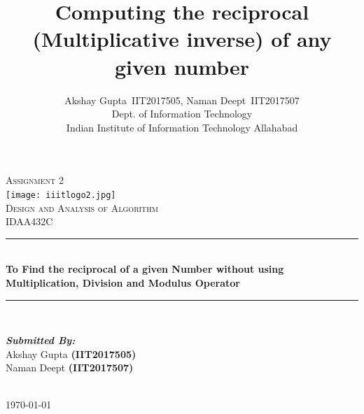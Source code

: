 \documentclass[twocolumn]{article}      %
\title{Computing the reciprocal (Multiplicative inverse) of any given number}  %
\author{Akshay Gupta~{IIT2017505}, \hspace{6pt}Naman Deept~{IIT2017507}  \\Dept. of Information Technology\\Indian Institute of Information Technology  Allahabad
 }
\begin{document}
\begin{titlepage}

\newcommand{\HRule}{\rule{\linewidth}{0.5mm}} %

\center %
 

\textsc{\LARGE Assignment 2}\\[1.5cm] %
\texttt{[image: iiitlogo2.jpg]}\\[1cm]
\textsc{\Large Design and Analysis of Algorithm}\\[0.5cm] %
\textsc{\large IDAA432C}\\[0.5cm] %


\HRule \\[0.4cm]
{ \large \bfseries To Find the reciprocal of a given Number without using Multiplication, Division and Modulus Operator }\\[0.4cm] %
\HRule \\[1.5cm]
 

\begin{minipage}{0.4\textwidth}
\begin{flushleft} \large
\textbf{\emph{Submitted By:}}\\
Akshay Gupta \textbf{(IIT2017505)}\\
Naman Deept \textbf{(IIT2017507)}
\end{flushleft}
\end{minipage}\\[2cm]



{\large \today}\\[2cm] %

\vfill %

\end{titlepage}
\end{document}
